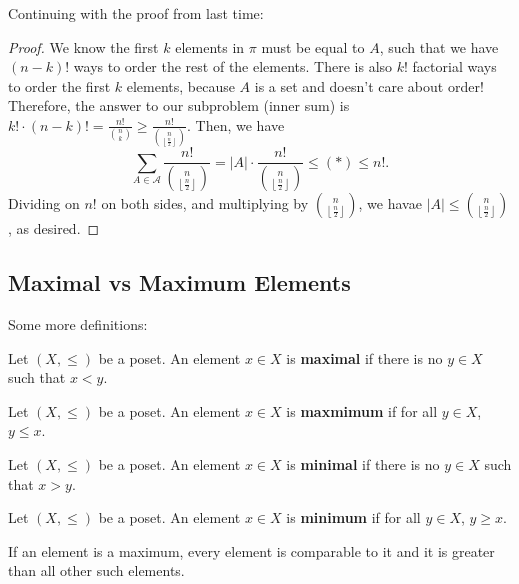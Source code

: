 
Continuing with the proof from last time:

\begin{proof}
	We know the first \( k \) elements in \( \pi  \) must be equal to \( A \), such that we have \( (n-k)! \) ways to order the rest of the elements. There is also \( k! \) factorial ways to order the first \( k \) elements, because \( A \) is a set and doesn't care about order! Therefore, the answer to our subproblem (inner sum) is \( k!\cdot (n-k)! = \frac{n!}{\binom{n}{k}} \ge \frac{n!}{\binom{n}{\left\lfloor \frac{n}{2} \right\rfloor}}\). Then, we have \[
		\sum_{A \in \mathcal{A}} \frac{n!}{\binom{n}{\left\lfloor \frac{n}{2} \right\rfloor}} = |A| \cdot \frac{n!}{\binom{n}{\left\lfloor \frac{n}{2} \right\rfloor}} \le (*) \le n!
	.\] Dividing on \( n! \) on both sides, and multiplying by \( \binom{n}{\left\lfloor \frac{n}{2} \right\rfloor} \), we havae \( |A| \le \binom{n}{\left\lfloor \frac{n}{2} \right\rfloor} \), as desired.
\end{proof}

\subsection{Maximal vs Maximum Elements}

Some more definitions:

\begin{definition}
	Let \( (X,\le ) \) be a poset. An element \( x \in X \) is \textbf{maximal} if there is no \( y \in X \) such that \( x<y \).
\end{definition}

\begin{definition}
	Let \( (X,\le ) \) be a poset. An element \( x \in X \) is \textbf{maxmimum} if for all \( y \in X \), \( y \le x \).
\end{definition}

\begin{definition}
	Let \( (X,\le ) \) be a poset. An element \( x \in X \) is \textbf{minimal} if there is no \( y \in X \) such that \( x>y \).
\end{definition}

\begin{definition}
	Let \( (X,\le ) \) be a poset. An element \( x \in X \) is \textbf{minimum} if for all \( y \in X \), \( y \ge x \).
\end{definition}

\begin{note}
	If an element is a maximum, every element is comparable to it and it is greater than all other such elements. 
\end{note}

